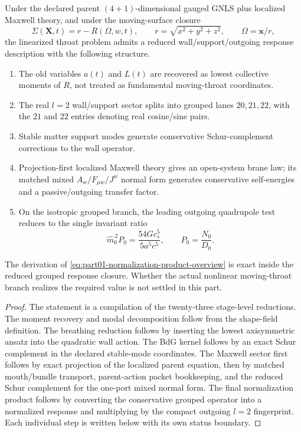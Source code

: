 \begin{theorem}
\label{thm:part01-backbone}
Under the declared parent \((4+1)\)-dimensional gauged GNLS plus localized Maxwell theory, and under the moving-surface closure
\begin{equation}
\label{eq:part01-shape-field-short}
\Sigma(\mathbf X,t)=r-R(\Omega,w,t),
\qquad
r=\sqrt{x^2+y^2+z^2},
\qquad
\Omega=\mathbf x/r,
\end{equation}
the linearized throat problem admits a reduced wall/support/outgoing response description with the following structure.
\begin{enumerate}[leftmargin=2.2em]
  \item The old variables \(a(t)\) and \(L(t)\) are recovered as lowest collective moments of \(R\), not treated as fundamental moving-throat coordinates.
  \item The real \(l=2\) wall/support sector splits into grouped lanes \(20,21,22\), with the \(21\) and \(22\) entries denoting real cosine/sine pairs.
  \item Stable matter support modes generate conservative Schur-complement corrections to the wall operator.
  \item Projection-first localized Maxwell theory gives an open-system brane law; its matched mixed \(A_w/F_{\mu w}/J^w\) normal form generates conservative self-energies and a passive/outgoing transfer factor.
  \item On the isotropic grouped branch, the leading outgoing quadrupole test reduces to the single invariant ratio
  \begin{equation}
  \label{eq:part01-normalization-product-overview}
  \widehat m_0^{\,2}P_0
  =
  \frac{54G c_s^5}{5a^5c^5},
  \qquad
  P_0=\frac{N_0}{D_0}.
  \end{equation}
\end{enumerate}
The derivation of \eqref{eq:part01-normalization-product-overview} is exact inside the reduced grouped response closure.  Whether the actual nonlinear moving-throat branch realizes the required value is not settled in this part.
\end{theorem}

\begin{proof}
The statement is a compilation of the twenty-three stage-level reductions.  The moment recovery and modal decomposition follow from the shape-field definition.  The breathing reduction follows by inserting the lowest axisymmetric ansatz into the quadratic wall action.  The BdG kernel follows by an exact Schur complement in the declared stable-mode coordinates.  The Maxwell sector first follows by exact projection of the localized parent equation, then by matched mouth/bundle transport, parent-action packet bookkeeping, and the reduced Schur complement for the one-port mixed normal form.  The final normalization product follows by converting the conservative grouped operator into a normalized response and multiplying by the compact outgoing \(l=2\) fingerprint.  Each individual step is written below with its own status boundary.
\end{proof}

